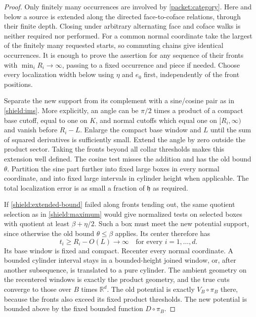 \documentclass[11pt]{article}
\numberwithin{equation}{section}
\theoremstyle{definition}
\theoremstyle{remark}
\begin{document}
\begin{proof}
Only finitely many occurrences are involved by \cref{packet:category}.
Here and below a source is extended along the directed face-to-coface
relations, through their finite depth.  Closing under arbitrary
alternating face and coface walks is neither required nor performed.
For a common normal coordinate take the largest of the finitely many
requested starts, so commuting chains give identical occurrences.
It is enough to prove the assertion for any sequence of their fronts
with $\min_iR_i\to\infty$, passing to a fixed occurrence and piece if
needed.  Choose every localization width below using $\eta$ and $e_0$
first, independently of the front positions.

Separate the new support from its complement with a sine/cosine pair
as in \cref{shield:ims}.  More explicitly, an angle can be $\pi/2$
times a product of a compact base cutoff, equal to one on $K$, and
normal cutoffs which equal one on $[R_i,\infty)$ and vanish before
$R_i-L$.  Enlarge the compact base window and $L$ until the sum of
squared derivatives is sufficiently small.  Extend the angle by zero
outside the product sector.  Taking the fronts beyond all collar
thresholds makes this extension well defined.  The cosine test misses
the addition and has the old bound $\theta$.  Partition the sine part
further into fixed large boxes in every normal coordinate, and into
fixed large intervals in cylinder height when applicable.  The total
localization error is as small a fraction of $\mathfrak h$ as required.

If \cref{shield:extended-bound} failed along fronts tending out, the
same quotient selection as in \cref{shield:maximum} would give
normalized tests on selected boxes with quotient at least
$\beta+\eta/2$.  Such a box must meet the new potential support,
since otherwise the old bound $\theta\le\beta$ applies.  Its center
therefore has
\[
 t_i\ge R_i-O(L)\longrightarrow\infty
 \quad\text{for every }i=1,\ldots,d.
\]
Its base window is fixed and compact.  Recenter every normal coordinate.
A bounded cylinder interval stays in a bounded-height joined window,
or, after another subsequence, is translated to a pure cylinder.  The
ambient geometry on the recentered windows is exactly the product
geometry, and the true cuts converge to those over $B$ times $\mathbb R^d$.
The old potential is exactly $V_B\circ\pi_B$ there, because the fronts
also exceed its fixed product thresholds.  The new potential is bounded
above by the fixed bounded function $D\circ\pi_B$.


\end{proof}
\end{document}
